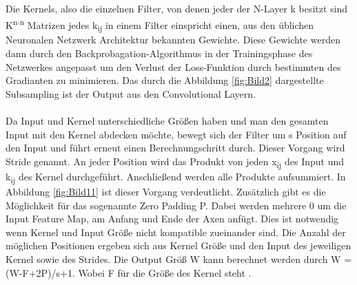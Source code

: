 \documentclass{llncs}
\begin{document}
Die Kernels, also die einzelnen Filter, von denen jeder der N-Layer k besitzt sind K\textsuperscript{n$\cdot$n} Matrizen jedes k\textsubscript{ij} in einem Filter einspricht einen, aus den üblichen Neuronalen Netzwerk Architektur bekannten Gewichte. Diese Gewichte werden dann durch den Backprobagation-Algorithmus in der Trainingsphase des Netzwerkes angepasst um den Verlust der Loss-Funktion durch bestimmten des Gradianten zu minimieren. Das durch die Abbildung \ref{fig:Bild2} dargestellte Subsampling ist der Output aus den Convolutional Layern\cite{Grundlagen}. 
\\\\
Da Input und Kernel unterschiedliche Größen haben und man den gesamten Input mit den Kernel abdecken möchte, bewegt sich der Filter um s Position auf den Input und führt erneut einen Berechnungschritt durch. Dieser Vorgang wird Stride genannt. An jeder Position wird das Produkt von jeden x\textsubscript{ij} des Input und k\textsubscript{ij} des Kernel durchgeführt.  Anschließend werden alle Produkte aufsummiert. In Abbildung \ref{fig:Bild11} ist dieser Vorgang verdeutlicht. Zusätzlich gibt es die Möglichkeit für das sogenannte Zero Padding P. Dabei werden mehrere 0 um die Input Feature Map, am Anfang und Ende der Axen anfügt. Dies ist notwendig wenn Kernel und Input Größe nicht kompatible zueinander sind. Die Anzahl der möglichen Positionen ergeben sich aus Kernel Größe und den Input des jeweiligen Kernel sowie des Strides. Die Output Größ W kann berechnet werden durch W = (W-F+2P)/s+1. Wobei F für die Größe des Kernel steht \cite{conv}.
\end{document}
